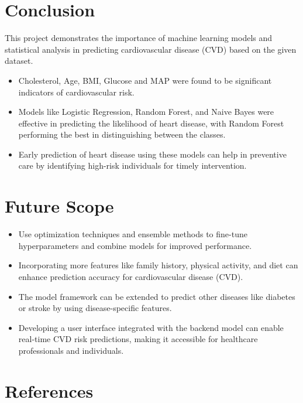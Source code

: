 \documentclass[12pt]{article}
\begin{document}
\section{Conclusion}
This project demonstrates the importance of machine learning models and statistical analysis in predicting cardiovascular disease (CVD) based on the given dataset.

\begin{itemize}
    \item Cholesterol, Age, BMI, Glucose and MAP were found to be significant indicators of cardiovascular risk.
    \item Models like Logistic Regression, Random Forest, and Naive Bayes were effective in predicting the likelihood of heart disease, with Random Forest performing the best in distinguishing between the classes.
    \item Early prediction of heart disease using these models can help in preventive care by identifying high-risk individuals for timely intervention.
\end{itemize}

\section{Future Scope}
\begin{itemize}
    \item Use optimization techniques and ensemble methods to fine-tune hyperparameters and combine models for improved performance.
    \item Incorporating more features like family history, physical activity, and diet can enhance prediction accuracy for cardiovascular disease (CVD).
    \item  The model framework can be extended to predict other diseases like diabetes or stroke by using disease-specific features.
    \item Developing a user interface integrated with the backend model can enable real-time CVD risk predictions, making it accessible for healthcare professionals and individuals.
\end{itemize}
\newpage
\section*{References}
\end{document}
